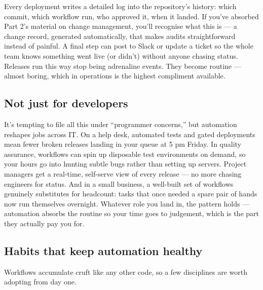 Every deployment writes a detailed log into the repository's history: which commit, which workflow run, who approved it, when it landed. If you've absorbed Part 2's material on change management, you'll recognise what this is — a change record, generated automatically, that makes audits straightforward instead of painful. A final step can post to Slack or update a ticket so the whole team knows something went live (or didn't) without anyone chasing status. Releases run this way stop being adrenaline events. They become routine — almost boring, which in operations is the highest compliment available.



\subsection{Not just for developers}


It's tempting to file all this under ``programmer concerns,'' but automation reshapes jobs across IT. On a help desk, automated tests and gated deployments mean fewer broken releases landing in your queue at 5 pm Friday. In quality assurance, workflows can spin up disposable test environments on demand, so your hours go into hunting subtle bugs rather than setting up servers. Project managers get a real-time, self-serve view of every release — no more chasing engineers for status. And in a small business, a well-built set of workflows genuinely substitutes for headcount: tasks that once needed a spare pair of hands now run themselves overnight. Whatever role you land in, the pattern holds — automation absorbs the routine so your time goes to judgement, which is the part they actually pay you for.



\subsection{Habits that keep automation healthy}


Workflows accumulate cruft like any other code, so a few disciplines are worth adopting from day one.



